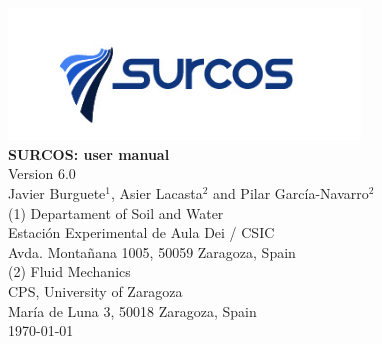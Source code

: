 \documentclass[11pt, twoside, openany, a4paper]{book}
\begin{document}

\nocite{*}

\pagestyle{empty}

\begin{titlepage} 
\begin{center} 
 
\includegraphics*[height=3.5cm]{images/logo_surcos.png}\\ 

\vspace*{3.5cm} 
{\Huge \textbf{SURCOS: user manual\\}}
\vspace*{1cm} 
{\normalsize Version 6.0}\\
\vspace*{1cm} 
{\Large Javier Burguete$^1$, Asier Lacasta$^2$ and Pilar García-Navarro$^2$}\\ 
\vspace*{2.5cm} 
{\normalsize (1) Departament of Soil and Water}\\
{Estación Experimental de Aula Dei / CSIC}\\ 
{Avda. Montañana 1005, 50059 Zaragoza, Spain}\\ 
\vspace*{1cm} 
{\normalsize (2) Fluid Mechanics}\\ 
{CPS, University of Zaragoza}\\ 
{María de Luna 3, 50018 Zaragoza, Spain}\\
\vspace*{1cm} 
{\normalsize \today}\\ 
\end{center} 
\end{titlepage} 
\cleardoublepage

\pagestyle{plain}

\tableofcontents
\listoffigures

\cleardoublepage

\pagestyle{headings}


\cleardoublepage


\cleardoublepage


\cleardoublepage


\cleardoublepage
\end{document}
